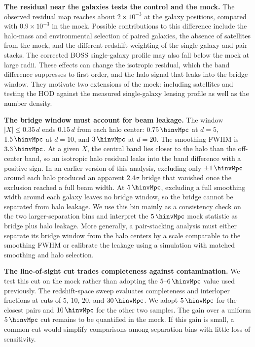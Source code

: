 \textbf{The residual near the galaxies tests the control and the mock.}
The observed residual map reaches about $2\times10^{-3}$ at the galaxy
positions, compared with $0.9\times10^{-3}$ in the mock. %
Possible contributions to this difference include the halo-mass and
environmental selection of paired galaxies, the absence of satellites from
the mock, and the different redshift weighting of the single-galaxy and pair
stacks. The corrected BOSS single-galaxy profile may also fall below the mock
at large radii. %
These effects can change the isotropic residual, which the band difference
suppresses to first order, and the halo signal that leaks
into the bridge window. They motivate two extensions of the mock: including
satellites and testing the HOD against the measured single-galaxy lensing
profile as well as the number density.

\textbf{The bridge window must account for beam leakage.} The window
$|X|\leq0.35\,d$ ends $0.15\,d$ from each halo center: $0.75\,\hinvMpc$ at
$d=5$, $1.5\,\hinvMpc$ at $d=10$, and $3\,\hinvMpc$ at $d=20$. The smoothing
FWHM is $3.3\,\hinvMpc$. At a given $X$, the central band lies closer to the
halo than the off-center band, so an isotropic
halo residual leaks into the band difference with a positive sign. In an
earlier version of this analysis, excluding only $\pm1\,\hinvMpc$ around
each halo produced an apparent $2.4\sigma$ bridge that vanished once the
exclusion reached a full beam width. %
At $5\,\hinvMpc$, excluding a full smoothing width around each galaxy leaves
no bridge window, so the bridge cannot be separated from halo leakage. We use
this bin mainly as a consistency check on the two larger-separation bins and
interpret the $5\,\hinvMpc$ mock statistic as bridge plus halo leakage.
More generally, a pair-stacking analysis must either separate its bridge
window from the halo centers by a scale comparable to the smoothing FWHM or
calibrate the leakage using a simulation with matched smoothing and halo
selection.

\textbf{The line-of-sight cut trades completeness against contamination.}
We test this cut on the mock rather than adopting the
$5$--$6\,\hinvMpc$ value used previously. The redshift-space sweep evaluates
completeness and interloper fractions at cuts of $5$, $10$, $20$, and
$30\,\hinvMpc$.
We adopt
$5\,\hinvMpc$ for the closest pairs and $10\,\hinvMpc$ for the other two
samples.
The gain over a uniform $5\,\hinvMpc$ cut remains to be quantified in the
mock. %
If this gain is small, a common cut would simplify comparisons
among separation bins with little loss of sensitivity.

